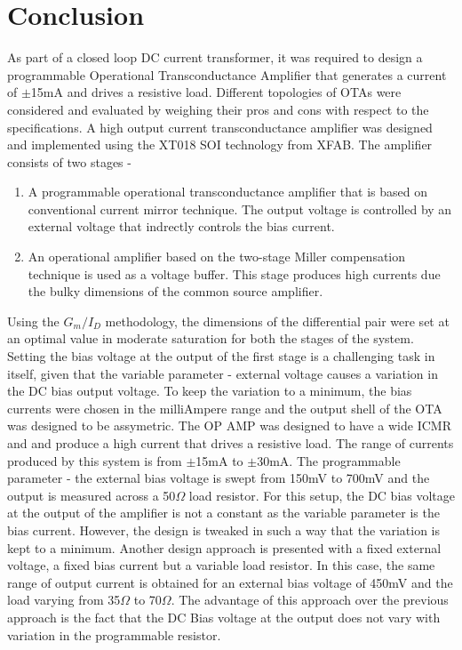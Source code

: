 \chapter{Conclusion}
As part of a closed loop DC current transformer, it was required to design a programmable Operational Transconductance Amplifier that generates a current of $\pm$15mA and drives a resistive load. Different topologies of OTAs were considered and evaluated by weighing their pros and cons with respect to the specifications.
A high output current transconductance amplifier was designed and implemented using the XT018 SOI technology from XFAB. The amplifier consists of two stages - 
\begin{enumerate}
\item A programmable operational transconductance amplifier that is based on conventional current mirror technique. The output voltage is controlled by an external voltage that indrectly controls the bias current.
\item An operational amplifier based on the two-stage Miller compensation technique is used as a voltage buffer. This stage produces high currents due the bulky dimensions of the common source amplifier.
\end{enumerate}
Using the $G_m/I_D$ methodology, the dimensions of the differential pair were set at an optimal value in moderate saturation for both the stages of the system. Setting the bias voltage at the output of the first stage is a challenging task in itself, given that the variable parameter - external voltage causes a variation in the DC bias output voltage. To keep the variation to a minimum, the bias currents were chosen in the milliAmpere range and the output shell of the OTA was designed to be assymetric. The OP AMP was designed to have a wide ICMR and and produce a high current that drives a resistive load. The range of currents produced by this system is from $\pm$15mA to $\pm$30mA. The programmable parameter - the external bias voltage is swept from 150mV to 700mV and the output is measured across a 50$\Omega$ load resistor. For this setup, the DC bias voltage at the output of the amplifier is not a constant as the variable parameter is the bias current. However, the design is tweaked in such a way that the variation is kept to a minimum. Another design approach is presented with a fixed external voltage, a fixed bias current but a variable load resistor. In this case, the same range of output current is obtained for an external bias voltage of 450mV and the load varying from 35$\Omega$ to 70$\Omega$. The advantage of this approach over the previous approach is the fact that the DC Bias voltage at the output does not vary with variation in the programmable resistor.
\vfill
\clearpage

